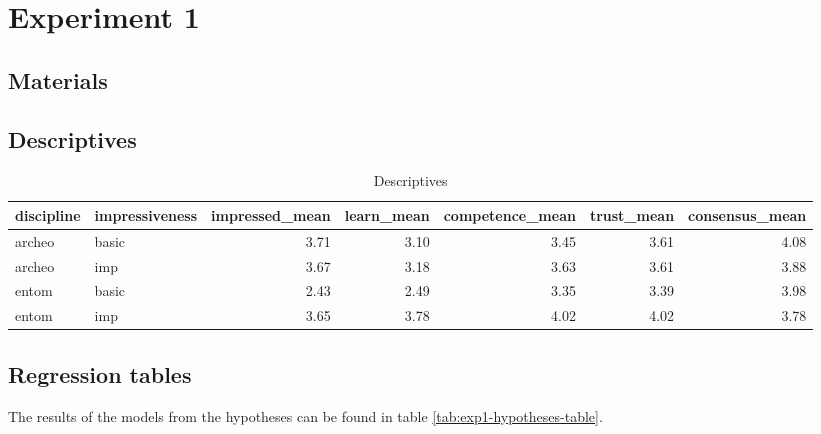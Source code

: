 \documentclass[
  doc,floatsintext]{apa6}
\begin{document}
\newpage

\appendix


\section{Experiment 1}\label{exp1}

\subsection{Materials}\label{materials-1}

\FloatBarrier

\subsection{Descriptives}\label{descriptives}

\begin{table}

\caption{\label{tab:exp1-descriptives}Descriptives}
\centering
\begin{tabular}[t]{llrrrrr}
\toprule
discipline & impressiveness & impressed\_mean & learn\_mean & competence\_mean & trust\_mean & consensus\_mean\\
\midrule
archeo & basic & 3.71 & 3.10 & 3.45 & 3.61 & 4.08\\
archeo & imp & 3.67 & 3.18 & 3.63 & 3.61 & 3.88\\
entom & basic & 2.43 & 2.49 & 3.35 & 3.39 & 3.98\\
entom & imp & 3.65 & 3.78 & 4.02 & 4.02 & 3.78\\
\bottomrule
\end{tabular}
\end{table}

\subsection{Regression tables}\label{regression-tables}

The results of the models from the hypotheses can be found in table \ref{tab:exp1-hypotheses-table}.
\end{document}
